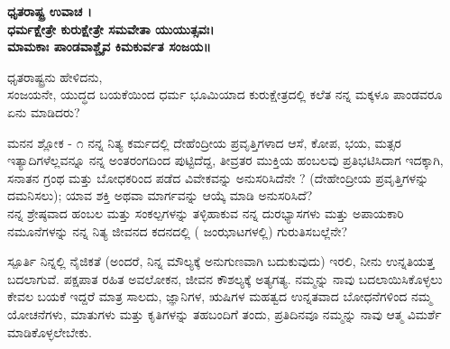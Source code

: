 \newpage
\thispagestyle{empty}
\vspace*{10px}
\begin{center}
\normalsize\textbf{\color{blue}ಧೃತರಾಷ್ಟ್ರ ಉವಾಚ ।\\
ಧರ್ಮಕ್ಷೇತ್ರೇ ಕುರುಕ್ಷೇತ್ರೇ ಸಮವೇತಾ ಯುಯುತ್ಸವಃ।\\
ಮಾಮಕಾಃ ಪಾಂಡವಾಶ್ಚೈವ ಕಿಮಕುರ್ವತ ಸಂಜಯ॥}
\end{center}
{\mananatext ಧೃತರಾಷ್ಟ್ರನು ಹೇಳಿದನು,\\
ಸಂಜಯನೇ, ಯುದ್ಧದ ಬಯಕೆಯಿಂದ ಧರ್ಮ ಭೂಮಿಯಾದ ಕುರುಕ್ಷೇತ್ರದಲ್ಲಿ ಕಲೆತ ನನ್ನ ಮಕ್ಕಳೂ ಪಾಂಡವರೂ ಏನು ಮಾಡಿದರು?\\}
\begin{mananam}{\mananamfont ಮನನ ಶ್ಲೋಕ - ೧}
{\small \mananatext ನನ್ನ ನಿತ್ಯ ಕರ್ಮದಲ್ಲಿ ದೇಹೆಂದ್ರೀಯ ಪ್ರವೃತ್ತಿಗಳಾದ ಆಸೆ, ಕೋಪ, ಭಯ, ಮತ್ಸರ ಇತ್ಯಾದಿಗಳೆಲ್ಲವನ್ನೂ ನನ್ನ ಅಂತರಂಗದಿಂದ ಪುಟ್ಟಿದೆದ್ದ, ತೀವ್ರತರ ಮುಕ್ತಿಯ ಹಂಬಲವು ಪ್ರತಿಭಟಿಸಿದಾಗ  ಇದಕ್ಕಾಗಿ, ಸನಾತನ ಗ್ರಂಥ ಮತ್ತು ಬೋಧಕರಿಂದ ಪಡೆದ ವಿವೇಕವನ್ನು ಅನುಸರಿಸಿದೆನೇ ? (ದೇಹೇಂದ್ರೀಯ ಪ್ರವೃತ್ತಿಗಳನ್ನು ದಮನಿಸಲು);  ಯಾವ ಶಕ್ತಿ ಅಥವಾ ಮಾರ್ಗವನ್ನು ಆಯ್ಕೆ ಮಾಡಿ ಅನುಸರಿಸಿದೆ?\\
ನನ್ನ ಶ್ರೇಷ್ಠವಾದ ಹಂಬಲ ಮತ್ತು ಸಂಕಲ್ಪಗಳನ್ನು ತಳ್ಳಿಹಾಕುವ ನನ್ನ ದುರಭ್ಯಾಸಗಳು ಮತ್ತು ಅಪಾಯಕಾರಿ ನಮೂನೆಗಳನ್ನು ನನ್ನ ನಿತ್ಯ ಜೀವನದ ಕದನದಲ್ಲಿ ( ಜಂಝಾಟಗಳಲ್ಲಿ) ಗುರುತಿಸಬಲ್ಲೆನೇ?
}
\end{mananam}
\begin{inspiration}{\mananamfont ಸ್ಪೂರ್ತಿ}
{\small \mananatext ನಿನ್ನಲ್ಲಿ ನೈಜಿಕತೆ (ಅಂದರೆ, ನಿನ್ನ ಮೌಲ್ಯಕ್ಕೆ ಅನುಗುಣವಾಗಿ ಬದುಕುವುದು) ಇರಲಿ,  ನೀನು ಉನ್ನತಿಯತ್ತ ಬದಲಾಗುವೆ.  ಪಕ್ಷಪಾತ ರಹಿತ ಅವಲೋಕನ, ಜೀವನ ಕೌಶಲ್ಯಕ್ಕೆ ಅತ್ಯಗತ್ಯ. ನಮ್ಮನ್ನು ನಾವು ಬದಲಾಯಿಸಿಕೊಳ್ಳಲು ಕೇವಲ ಬಯಕೆ ಇದ್ದರೆ ಮಾತ್ರ ಸಾಲದು, ಜ್ಞಾನಿಗಳ, ಋಷಿಗಳ ಮಹತ್ವದ ಉನ್ನತವಾದ ಬೋಧನೆಗಳಿಂದ ನಮ್ಮ ಯೋಚನೆಗಳು, ಮಾತುಗಳು ಮತ್ತು ಕೃತಿಗಳನ್ನು ತಹಬಂದಿಗೆ ತಂದು, ಪ್ರತಿದಿನವೂ ನಮ್ಮನ್ನು ನಾವು ಆತ್ಮ ವಿಮರ್ಶೆ ಮಾಡಿಕೊಳ್ಳಲೇಬೇಕು.}
\end{inspiration}
\newpage